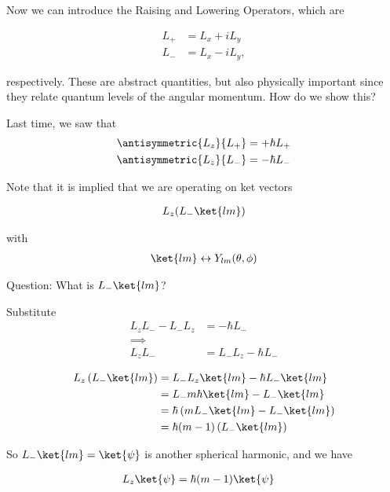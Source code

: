 Now we can introduce the Raising and Lowering Operators, which are

\begin{align}\label{eqn:PHY356Foct19:1010}
L_{+} &= L_x + i L_y \\
L_{-} &= L_x - i L_y,
\end{align}

respectively.  These are abstract quantities, but also physically important since they relate quantum levels of the angular momentum.  How do we show this?

Last time, we saw that
\begin{align}\label{eqn:PHY356Foct19:1011}
\antisymmetric{L_z}{L_{+}} &= +\hbar L_{+} \\
\antisymmetric{L_z}{L_{-}} &= -\hbar L_{-}
\end{align}

Note that it is implied that we are operating on ket vectors

\begin{align*}
L_z (L_{-} \ket{lm} )
\end{align*}

with
\begin{align}\label{eqn:PHY356Foct19:1012}
\ket{lm} \leftrightarrow Y_{lm}(\theta, \phi)
\end{align}

Question: What is $L_{-} \ket{lm}$?

Substitute
\begin{align*}
L_z L_{-} - L_{-} L_z &= - \hbar L_{-} \\
\implies \\
L_z L_{-} &= L_{-} L_z - \hbar L_{-}
\end{align*}

\begin{align*}
L_z \left( L_{-} \ket{lm} \right)
&=
L_{-} L_z \ket{lm} - \hbar L_{-} \ket{lm} \\
&=
L_{-} m \hbar \ket{lm} - L_{-} \ket{lm} \\
&=
\hbar \left( m L_{-} \ket{lm} - L_{-} \ket{lm} \right) \\
&=
\hbar (m-1) \left( L_{-} \ket{lm} \right)
\end{align*}

So $L_{-} \ket{lm} = \ket{\psi}$ is another spherical harmonic, and we have

\begin{align}\label{eqn:PHY356Foct19:1013}
L_z \ket{\psi} &= \hbar (m-1) \ket{\psi}
\end{align}

